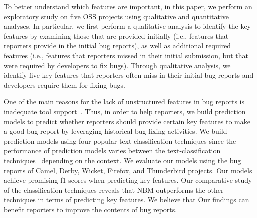 \documentclass[conference]{IEEEtran}
\begin{document}
To better understand which features are important, in this paper, we perform an exploratory study on five OSS projects using qualitative and quantitative analyses. In particular, we first perform a qualitative analysis to identify the key features by examining those that are provided initially (i.e., features that reporters provide in the initial bug reports), as well as additional required features (i.e., features that reporters missed in their initial submission, but that were required by developers to fix bugs). Through qualitative analysis, we identify five key features that reporters often miss in their initial bug reports and developers require them for fixing bugs.

One of the main reasons for the lack of unstructured features in bug reports is inadequate tool support~\cite{Zimmermann:2012, Breu:2010, Chaparro:2017, github:2016}. Thus, in order to help reporters, we build prediction models to predict whether reporters should provide certain key features to make a good bug report by leveraging historical bug-fixing activities. We build prediction models using four popular text-classification techniques since the performance of prediction models varies between the text-classification techniques~\cite{Yang:2002, Xia:2014} depending on the context. We evaluate our models using the bug reports of Camel, Derby, Wicket, Firefox, and Thunderbird projects. Our models achieve promising f1-scores when predicting key features. Our comparative study of the classification techniques reveals that NBM outperforms the other techniques in terms of predicting key features. We believe that Our findings can benefit reporters to improve the contents of bug reports.
\end{document}
